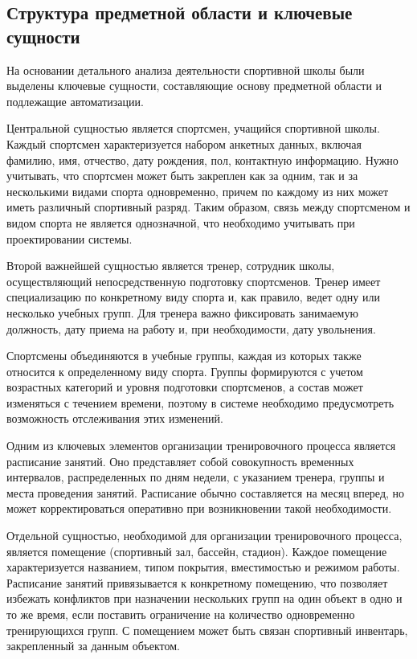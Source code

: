 \subsection{Структура предметной области и ключевые сущности}

На основании детального анализа деятельности спортивной школы были выделены ключевые сущности, составляющие основу предметной области и подлежащие автоматизации.

Центральной сущностью является спортсмен, учащийся спортивной школы. Каждый спортсмен характеризуется набором анкетных данных, включая фамилию, имя, отчество, дату рождения, пол, контактную информацию. Нужно учитывать, что спортсмен может быть закреплен как за одним, так и за несколькими видами спорта одновременно, причем по каждому из них может иметь различный спортивный разряд. Таким образом, связь между спортсменом и видом спорта не является однозначной, что необходимо учитывать при проектировании системы.

Второй важнейшей сущностью является тренер, сотрудник школы, осуществляющий непосредственную подготовку спортсменов. Тренер имеет специализацию по конкретному виду спорта и, как правило, ведет одну или несколько учебных групп. Для тренера важно фиксировать занимаемую должность, дату приема на работу и, при необходимости, дату увольнения.

Спортсмены объединяются в учебные группы, каждая из которых также относится к определенному виду спорта. Группы формируются с учетом возрастных категорий и уровня подготовки спортсменов, а состав может изменяться с течением времени, поэтому в системе необходимо предусмотреть возможность отслеживания этих изменений.

Одним из ключевых элементов организации тренировочного процесса является расписание занятий. Оно представляет собой совокупность временных интервалов, распределенных по дням недели, с указанием тренера, группы и места проведения занятий. Расписание обычно составляется на месяц вперед, но может корректироваться оперативно при возникновении такой необходимости.

Отдельной сущностью, необходимой для организации тренировочного процесса, является помещение (спортивный зал, бассейн, стадион). Каждое помещение характеризуется названием, типом покрытия, вместимостью и режимом работы. Расписание занятий привязывается к конкретному помещению, что позволяет избежать конфликтов при назначении нескольких групп на один объект в одно и то же время, если поставить ограничение на количество одновременно тренирующихся групп. С помещением может быть связан спортивный инвентарь, закрепленный за данным объектом.

